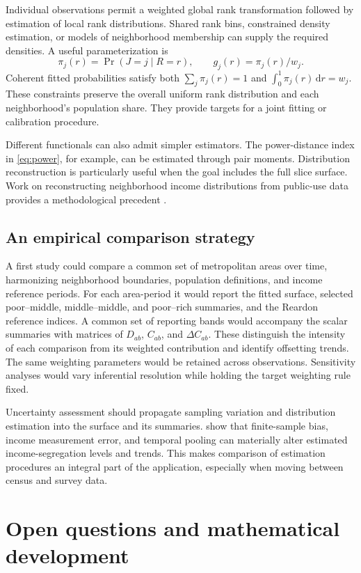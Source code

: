 \documentclass[11pt]{article}
\newcommand{\dd}{\,\mathrm{d}}
\begin{document}
Individual observations permit a weighted global rank transformation followed by estimation of local rank distributions. Shared rank bins, constrained density estimation, or models of neighborhood membership can supply the required densities. A useful parameterization is
\[
\pi_j(r)=\Pr(J=j\mid R=r),\qquad
g_j(r)=\pi_j(r)/w_j.
\]
Coherent fitted probabilities satisfy both $\sum_j\pi_j(r)=1$ and $\int_0^1\pi_j(r)\dd r=w_j$. These constraints preserve the overall uniform rank distribution and each neighborhood's population share. They provide targets for a joint fitting or calibration procedure.

Different functionals can also admit simpler estimators. The power-distance index in \eqref{eq:power}, for example, can be estimated through pair moments. Distribution reconstruction is particularly useful when the goal includes the full slice surface. Work on reconstructing neighborhood income distributions from public-use data provides a methodological precedent \citep{simpson2021}.

\subsection{An empirical comparison strategy}

A first study could compare a common set of metropolitan areas over time, harmonizing neighborhood boundaries, population definitions, and income reference periods. For each area-period it would report the fitted surface, selected poor--middle, middle--middle, and poor--rich summaries, and the Reardon reference indices. A common set of reporting bands would accompany the scalar summaries with matrices of $D_{ab}$, $C_{ab}$, and $\Delta C_{ab}$. These distinguish the intensity of each comparison from its weighted contribution and identify offsetting trends. The same weighting parameters would be retained across observations. Sensitivity analyses would vary inferential resolution while holding the target weighting rule fixed.

Uncertainty assessment should propagate sampling variation and distribution estimation into the surface and its summaries. \citet{leung2023} show that finite-sample bias, income measurement error, and temporal pooling can materially alter estimated income-segregation levels and trends. This makes comparison of estimation procedures an integral part of the application, especially when moving between census and survey data.

\section{Open questions and mathematical development}
\end{document}

